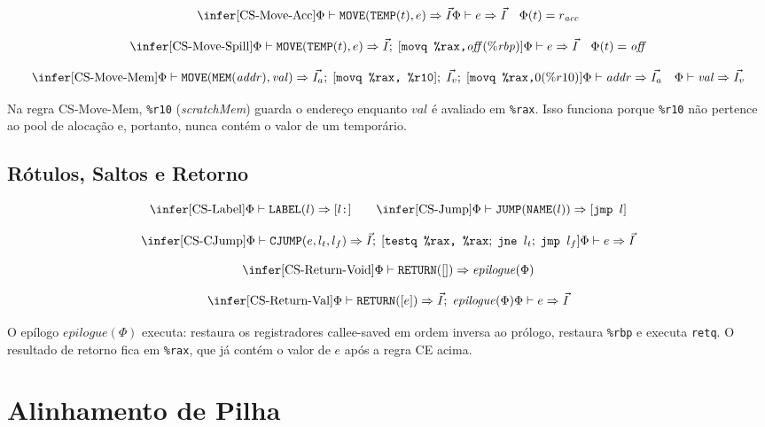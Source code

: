 \[
  \infer[\text{CS-Move-Acc}]
  {\Phi \vdash \texttt{MOVE}(\texttt{TEMP}(t), e) \Rightarrow \vec{I}}
  {\Phi \vdash e \Rightarrow \vec{I} \quad \Phi(t) = r_{\mathit{acc}}}
\]

\[
  \infer[\text{CS-Move-Spill}]
  {\Phi \vdash \texttt{MOVE}(\texttt{TEMP}(t), e) \Rightarrow \vec{I};\;
  [\texttt{movq \%rax,} \mathit{off}(\%\mathit{rbp})]}
  {\Phi \vdash e \Rightarrow \vec{I} \quad \Phi(t) = \mathit{off}}
\]

\[
  \infer[\text{CS-Move-Mem}]
  {\Phi \vdash \texttt{MOVE}(\texttt{MEM}(\mathit{addr}),
    \mathit{val}) \Rightarrow
    \vec{I_a};\; [\texttt{movq \%rax, \%r10}];\; \vec{I_v};\;
  [\texttt{movq \%rax,} 0(\%r10)]}
  {\Phi \vdash \mathit{addr} \Rightarrow \vec{I_a} \quad \Phi \vdash
  \mathit{val} \Rightarrow \vec{I_v}}
\]

Na regra CS-Move-Mem, \texttt{\%r10} (\textit{scratchMem}) guarda o
endereço enquanto $\mathit{val}$ é avaliado em \texttt{\%rax}. Isso
funciona porque \texttt{\%r10} não pertence ao pool de alocação e,
portanto, nunca contém o valor de um temporário.

\subsection{Rótulos, Saltos e Retorno}

\[
  \infer[\text{CS-Label}]
  {\Phi \vdash \texttt{LABEL}(l) \Rightarrow [l\texttt{:}]}{}
  \qquad
  \infer[\text{CS-Jump}]
  {\Phi \vdash \texttt{JUMP}(\texttt{NAME}(l)) \Rightarrow [\texttt{jmp } l]}{}
\]

\[
  \infer[\text{CS-CJump}]
  {\Phi \vdash \texttt{CJUMP}(e, l_t, l_f) \Rightarrow
    \vec{I};\; [\texttt{testq \%rax, \%rax};\; \texttt{jne } l_t;\;
  \texttt{jmp } l_f]}
  {\Phi \vdash e \Rightarrow \vec{I}}
\]

\[
  \infer[\text{CS-Return-Void}]
  {\Phi \vdash \texttt{RETURN}([]) \Rightarrow \mathit{epilogue}(\Phi)}{}
\]

\[
  \infer[\text{CS-Return-Val}]
  {\Phi \vdash \texttt{RETURN}([e]) \Rightarrow \vec{I};\;
  \mathit{epilogue}(\Phi)}
  {\Phi \vdash e \Rightarrow \vec{I}}
\]

O epílogo $\mathit{epilogue}(\Phi)$ executa: restaura os registradores
callee-saved em ordem inversa ao prólogo, restaura \texttt{\%rbp} e executa
\texttt{retq}. O resultado de retorno fica em \texttt{\%rax}, que já contém
o valor de $e$ após a regra CE acima.

\section{Alinhamento de Pilha}


